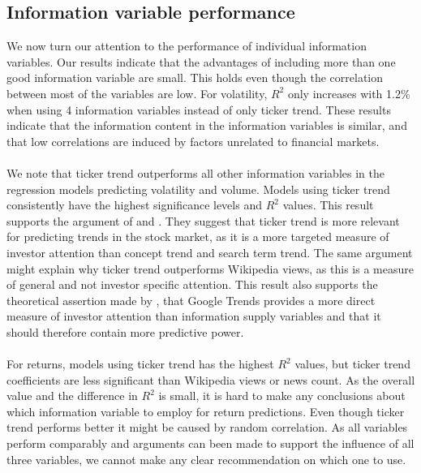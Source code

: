 \subsection{Information variable performance}
We now turn our attention to the performance of individual information variables. Our results indicate that the advantages of including more than one good information variable are small. This holds even though the correlation between most of the variables are low. For volatility, $R^2$ only increases with 1.2\% when using 4 information variables instead of only ticker trend. These results indicate that the information content in the information variables is similar, and that low correlations are induced by factors unrelated to financial markets. 
\\\\
We note that ticker trend outperforms all other information variables in the regression models predicting volatility and volume. Models using ticker trend consistently have the highest significance levels and $R^2$ values. This result supports the argument of \cite{engelberg} and \cite{joseph}. They suggest that ticker trend is more relevant for predicting trends in the stock market, as it is a more targeted measure of investor attention than concept trend and search term trend. The same argument might explain why ticker trend outperforms Wikipedia views, as this is a measure of general and not investor specific attention. This result also supports the theoretical assertion made by \cite{engelberg}, that Google Trends provides a more direct measure of investor attention than information supply variables and that it should therefore contain more predictive power. 
\\\\
For returns, models using ticker trend has the highest $R^2$ values, but ticker trend coefficients are less significant than Wikipedia views or news count. As the overall value and the difference in $R^2$ is small, it is hard to make any conclusions about which information variable to employ for return predictions. Even though ticker trend performs better it might be caused by random correlation. As all variables perform comparably and arguments can been made to support the influence of all three variables, we cannot make any clear recommendation on which one to use. 
\\\\
